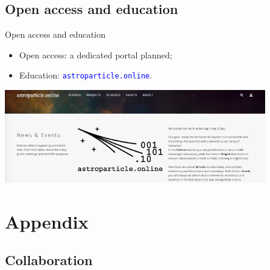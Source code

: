 \documentclass[18pt]{beamer}
\newcommand{\insimg}[1]{
\begin{tikzpicture}[remember picture,overlay]
  \node[xshift=-7.7ex,yshift=12ex] at (current page.south east){%
    \texttt{[image: pics/\#1]}
  };
\end{tikzpicture}
}
\begin{document}
\subsection{Open access and education}

\begin{frame}{Open access and education}
\vspace{-4em}
\begin{itemize}
\item Open access: a dedicated portal planned;
\item Education: \textcolor{blue}{\texttt{astroparticle.online}}.
\end{itemize}
\centering
\includegraphics[width=0.85\textwidth]{pics/astro_onl.png}
\end{frame}



\appendix
\beginbackup

\section{Appendix}
\subsection{Collaboration}
\end{document}
